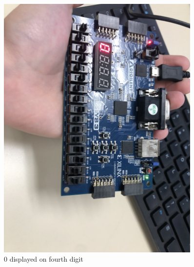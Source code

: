 \documentclass[11pt]{article}
\begin{document}
\begin{figure}[ht]\centering 
	\includegraphics[width= 0.9\textwidth]{b9.png}
	\caption{0 displayed on fourth digit}
	\label{fig: pic8}
\end{figure}
\end{document}
